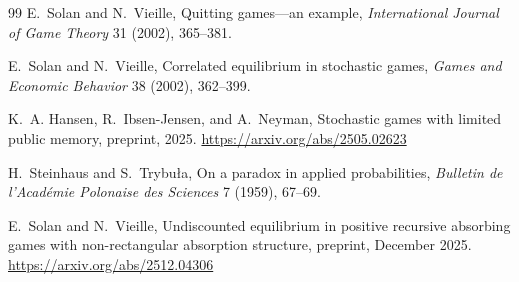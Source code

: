 \documentclass[11pt]{article}
\begin{document}
\begin{thebibliography}{99}
E.~Solan and N.~Vieille, Quitting games---an example,
\emph{International Journal of Game Theory} 31 (2002), 365--381.

E.~Solan and N.~Vieille, Correlated equilibrium in stochastic games,
\emph{Games and Economic Behavior} 38 (2002), 362--399.

K.~A. Hansen, R.~Ibsen-Jensen, and A.~Neyman, Stochastic games with limited
public memory, preprint, 2025.  \url{https://arxiv.org/abs/2505.02623}

H.~Steinhaus and S.~Trybu{\l}a, On a paradox in applied probabilities,
\emph{Bulletin de l'Acad\'emie Polonaise des Sciences} 7 (1959), 67--69.

E.~Solan and N.~Vieille, Undiscounted equilibrium in positive recursive
absorbing games with non-rectangular absorption structure, preprint, December
2025.  \url{https://arxiv.org/abs/2512.04306}

\end{thebibliography}
\end{document}
